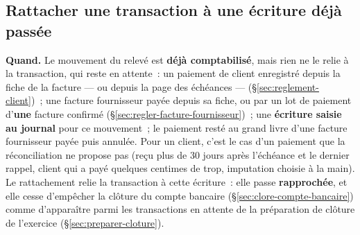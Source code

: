 \documentclass[a4paper,11pt,oneside]{article}
\begin{document}
\subsection{Rattacher une transaction à une écriture déjà passée}\label{sec:rattacher-reglement}

\textbf{Quand.} Le mouvement du relevé est \textbf{déjà comptabilisé}, mais rien ne le relie à la transaction, qui reste en attente~: un paiement de client enregistré depuis la fiche de la facture --- ou depuis la page des échéances --- (\S\ref{sec:reglement-client})~; une facture fournisseur payée depuis sa fiche, ou par un lot de paiement d'\textbf{une} facture confirmé (\S\ref{sec:regler-facture-fournisseur})~; une \textbf{écriture saisie au journal} pour ce mouvement~; le paiement resté au grand livre d'une facture fournisseur payée puis annulée. Pour un client, c'est le cas d'un paiement que la réconciliation ne propose pas (reçu plus de 30 jours après l'échéance et le dernier rappel, client qui a payé quelques centimes de trop, imputation choisie à la main). Le rattachement relie la transaction à cette écriture~: elle passe \textbf{rapprochée}, et elle cesse d'empêcher la clôture du compte bancaire (\S\ref{sec:clore-compte-bancaire}) comme d'apparaître parmi les transactions en attente de la préparation de clôture de l'exercice (\S\ref{sec:preparer-cloture}).
\end{document}
